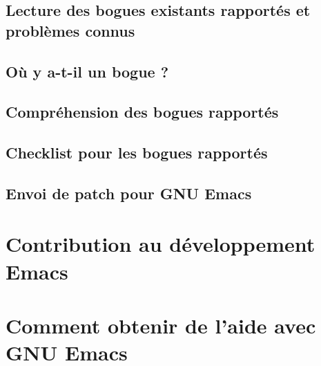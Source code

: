 \subsection{Lecture des bogues existants rapportés et problèmes
  connus}\label{chap34sec3subsec1}
\subsection{Où y a-t-il un bogue ?}\label{chap34sec3subsec2}
\subsection{Compréhension des bogues rapportés}\label{chap34sec3subsec3}
\subsection{Checklist pour les bogues rapportés}\label{chap34sec3subsec4}
\subsection{Envoi de patch pour GNU Emacs}\label{chap34sec3subsec5}
\section{Contribution au développement Emacs}\label{chap34sec4}
\section{Comment obtenir de l'aide avec GNU Emacs}\label{chap34sec5}
